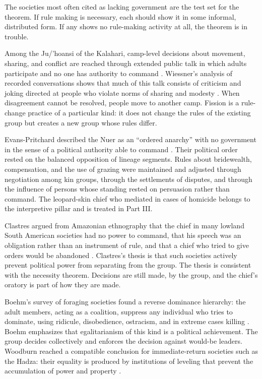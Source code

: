 \documentclass[11pt,letterpaper]{article}
\theoremstyle{definition}
\theoremstyle{remark}
\begin{document}
The societies most often cited as lacking government are the test set for the theorem. If rule making is necessary, each should show it in some informal, distributed form. If any shows no rule-making activity at all, the theorem is in trouble.

Among the Ju/'hoansi of the Kalahari, camp-level decisions about movement, sharing, and conflict are reached through extended public talk in which adults participate and no one has authority to command \citep{lee2013}. Wiessner's analysis of recorded conversations shows that much of this talk consists of criticism and joking directed at people who violate norms of sharing and modesty \citep{wiessner2005}. When disagreement cannot be resolved, people move to another camp. Fission is a rule-change practice of a particular kind: it does not change the rules of the existing group but creates a new group whose rules differ.

Evans-Pritchard described the Nuer as an ``ordered anarchy'' with no government in the sense of a political authority able to command \citep{evanspritchard1940}. Their political order rested on the balanced opposition of lineage segments. Rules about bridewealth, compensation, and the use of grazing were maintained and adjusted through negotiation among kin groups, through the settlements of disputes, and through the influence of persons whose standing rested on persuasion rather than command. The leopard-skin chief who mediated in cases of homicide belongs to the interpretive pillar and is treated in Part III.

Clastres argued from Amazonian ethnography that the chief in many lowland South American societies had no power to command, that his speech was an obligation rather than an instrument of rule, and that a chief who tried to give orders would be abandoned \citep{clastres1987}. Clastres's thesis is that such societies actively prevent political power from separating from the group. The thesis is consistent with the necessity theorem. Decisions are still made, by the group, and the chief's oratory is part of how they are made.

Boehm's survey of foraging societies found a reverse dominance hierarchy: the adult members, acting as a coalition, suppress any individual who tries to dominate, using ridicule, disobedience, ostracism, and in extreme cases killing \citep{boehm1999}. Boehm emphasizes that egalitarianism of this kind is a political achievement. The group decides collectively and enforces the decision against would-be leaders. Woodburn reached a compatible conclusion for immediate-return societies such as the Hadza: their equality is produced by institutions of leveling that prevent the accumulation of power and property \citep{woodburn1982}.
\end{document}
